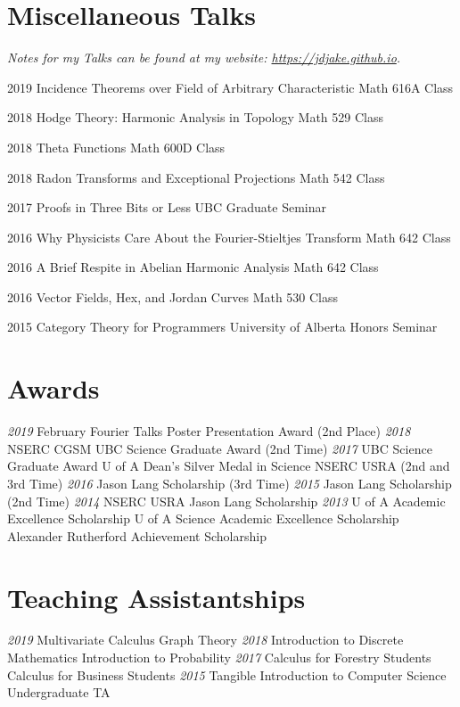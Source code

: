 \documentclass[a4paper]{cv-friggeri}
\begin{document}
\section{Miscellaneous Talks}

\emph{Notes for my Talks can be found at my website: \href{https://jdjake.github.io}{https://jdjake.github.io}.}

\begin{entrylist}

\entry
{2019}
{Incidence Theorems over Field of Arbitrary Characteristic}
{Math 616A Class}
{}

\entry
{2018}
{Hodge Theory: Harmonic Analysis in Topology}
{Math 529 Class}
{}

\entry
{2018}
{Theta Functions}
{Math 600D Class}
{}

\entry
{2018}
{Radon Transforms and Exceptional Projections}
{Math 542 Class}
{}

\entry
{2017}
{Proofs in Three Bits or Less}
{UBC Graduate Seminar}
{}

\entry
{2016}
{Why Physicists Care About the Fourier-Stieltjes Transform}
{Math 642 Class}
{}

\entry
{2016}
{A Brief Respite in Abelian Harmonic Analysis}
{Math 642 Class}
{}

\entry
{2016}
{Vector Fields, Hex, and Jordan Curves}
{Math 530 Class}
{}

\entry
{2015}
{Category Theory for Programmers}
{University of Alberta Honors Seminar}
{}

\end{entrylist}

\begin{asidenotit}
\section{Awards}
\emph{2019}
February Fourier Talks Poster Presentation Award (2nd Place)
\emph{2018}
NSERC CGSM
UBC Science Graduate Award
(2nd Time)
\emph{2017}
UBC Science Graduate Award
U of A Dean's Silver Medal in Science
NSERC USRA
(2nd and 3rd Time)
\emph{2016}
Jason Lang Scholarship
(3rd Time)
\emph{2015}
Jason Lang Scholarship
(2nd Time)
\emph{2014}
NSERC USRA
Jason Lang Scholarship
\emph{2013}
U of A Academic Excellence Scholarship
U of A Science Academic Excellence Scholarship
Alexander Rutherford Achievement Scholarship
~
\section{Teaching Assistantships}
\emph{2019}
Multivariate Calculus
Graph Theory
\emph{2018}
Introduction to Discrete Mathematics
Introduction to Probability
\emph{2017}
Calculus for Forestry Students
Calculus for Business Students
\emph{2015}
Tangible Introduction to Computer Science Undergraduate TA
\end{asidenotit}
\end{document}
